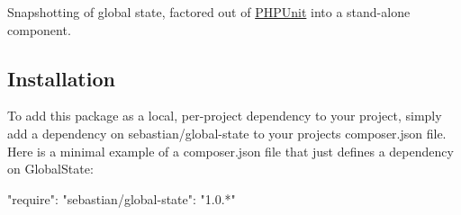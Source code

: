Snapshotting of global state, factored out of \mbox{\hyperlink{namespace_p_h_p_unit}{P\+H\+P\+Unit}} into a stand-\/alone component.

\href{https://travis-ci.org/sebastianbergmann/global-state}{\tt }

\subsection*{Installation}

To add this package as a local, per-\/project dependency to your project, simply add a dependency on {\ttfamily sebastian/global-\/state} to your project\textquotesingle{}s {\ttfamily composer.\+json} file. Here is a minimal example of a {\ttfamily composer.\+json} file that just defines a dependency on Global\+State\+: \begin{DoxyVerb}{
    "require": {
        "sebastian/global-state": "1.0.*"
    }
}\end{DoxyVerb}
 